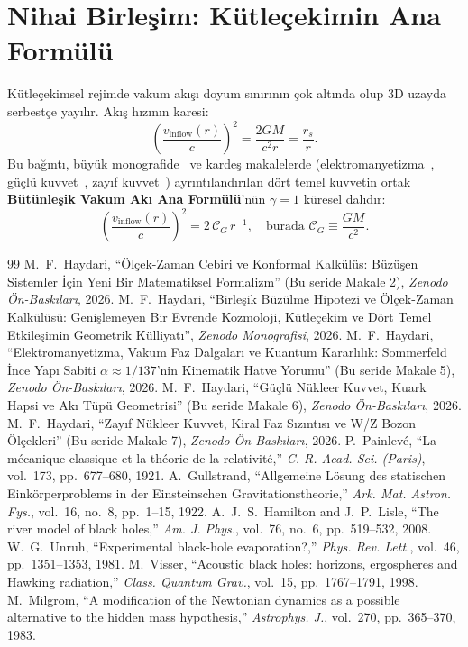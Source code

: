 \documentclass[11pt,a4paper]{article}
\begin{document}
\section{Nihai Birleşim: Kütleçekimin Ana Formülü}
\label{sec:ana_formul_kutlecekim}

Kütleçekimsel rejimde vakum akışı doyum sınırının çok altında olup 3D uzayda serbestçe yayılır. Akış hızının karesi:
\begin{equation}
    \left( \frac{v_{\mathrm{inflow}}(r)}{c} \right)^2 = \frac{2GM}{c^2 r} = \frac{r_s}{r}.
    \label{eq:kutlecekim_master}
\end{equation}
Bu bağıntı, büyük monografide~\cite{main_paper} ve kardeş makalelerde (elektromanyetizma~\cite{paper2}, güçlü kuvvet~\cite{paper3}, zayıf kuvvet~\cite{paper4}) ayrıntılandırılan dört temel kuvvetin ortak \textbf{Bütünleşik Vakum Akı Ana Formülü}'nün $\gamma = 1$ küresel dalıdır:
\begin{equation}
    \boxed{ \left( \frac{v_{\mathrm{inflow}}(r)}{c} \right)^2 = 2 \, \mathcal{C}_G \, r^{-1}, \quad \text{burada } \mathcal{C}_G \equiv \frac{GM}{c^2}. }
\end{equation}

\begin{thebibliography}{99}
     M.~F.~Haydari, ``Ölçek-Zaman Cebiri ve Konformal Kalkülüs: Büzüşen Sistemler İçin Yeni Bir Matematiksel Formalizm'' (Bu seride Makale 2), \textit{Zenodo Ön-Baskıları}, 2026.
     M.~F.~Haydari, ``Birleşik Büzülme Hipotezi ve Ölçek-Zaman Kalkülüsü: Genişlemeyen Bir Evrende Kozmoloji, Kütleçekim ve Dört Temel Etkileşimin Geometrik Külliyatı'', \textit{Zenodo Monografisi}, 2026.
     M.~F.~Haydari, ``Elektromanyetizma, Vakum Faz Dalgaları ve Kuantum Kararlılık: Sommerfeld İnce Yapı Sabiti $\alpha \approx 1/137$'nin Kinematik Hatve Yorumu'' (Bu seride Makale 5), \textit{Zenodo Ön-Baskıları}, 2026.
     M.~F.~Haydari, ``Güçlü Nükleer Kuvvet, Kuark Hapsi ve Akı Tüpü Geometrisi'' (Bu seride Makale 6), \textit{Zenodo Ön-Baskıları}, 2026.
     M.~F.~Haydari, ``Zayıf Nükleer Kuvvet, Kiral Faz Sızıntısı ve W/Z Bozon Ölçekleri'' (Bu seride Makale 7), \textit{Zenodo Ön-Baskıları}, 2026.
     P.~Painlev\'e, ``La m\'ecanique classique et la th\'eorie de la relativit\'e,'' \textit{C. R. Acad. Sci. (Paris)}, vol.~173, pp.~677--680, 1921.
     A.~Gullstrand, ``Allgemeine L\"osung des statischen Eink\"orperproblems in der Einsteinschen Gravitationstheorie,'' \textit{Ark. Mat. Astron. Fys.}, vol.~16, no.~8, pp.~1--15, 1922.
     A.~J.~S.~Hamilton and J.~P.~Lisle, ``The river model of black holes,'' \textit{Am. J. Phys.}, vol.~76, no.~6, pp.~519--532, 2008.
     W.~G.~Unruh, ``Experimental black-hole evaporation?,'' \textit{Phys. Rev. Lett.}, vol.~46, pp.~1351--1353, 1981.
     M.~Visser, ``Acoustic black holes: horizons, ergospheres and Hawking radiation,'' \textit{Class. Quantum Grav.}, vol.~15, pp.~1767--1791, 1998.
     M.~Milgrom, ``A modification of the Newtonian dynamics as a possible alternative to the hidden mass hypothesis,'' \textit{Astrophys. J.}, vol.~270, pp.~365--370, 1983.
\end{thebibliography}
\end{document}
